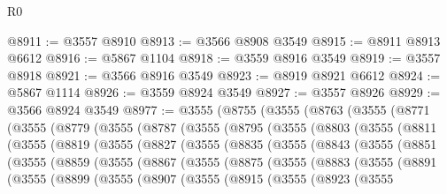 \begin{lexlean}{R0}
\begin{coremodule}
@8911 := @3557 @8910
@8913 := @3566 @8908 @3549
@8915 := @8911 @8913 @6612
@8916 := @5867 @1104
@8918 := @3559 @8916 @3549
@8919 := @3557 @8918
@8921 := @3566 @8916 @3549
@8923 := @8919 @8921 @6612
@8924 := @5867 @1114
@8926 := @3559 @8924 @3549
@8927 := @3557 @8926
@8929 := @3566 @8924 @3549
@8977 := @3555
    (@8755
      (@3555
        (@8763
          (@3555
            (@8771
              (@3555
                (@8779
                  (@3555
                    (@8787
                      (@3555
                        (@8795
                          (@3555
                            (@8803
                              (@3555
                                (@8811
                                  (@3555
                                    (@8819
                                      (@3555
                                        (@8827
                                          (@3555
                                            (@8835
                                              (@3555
                                                (@8843
                                                  (@3555
                                                    (@8851
                                                      (@3555
                                                        (@8859
                                                          (@3555
                                                            (@8867
                                                              (@3555
                                                                (@8875
                                                                  (@3555
                                                                    (@8883
                                                                      (@3555
                                                                        (@8891
                                                                          (@3555
                                                                            (@8899
                                                                              (@3555
                                                                                (@8907
                                                                                  (@3555
                                                                                    (@8915
                                                                                      (@3555
                                                                                        (@8923
                                                                                          (@3555

\end{coremodule}
\end{lexlean}
